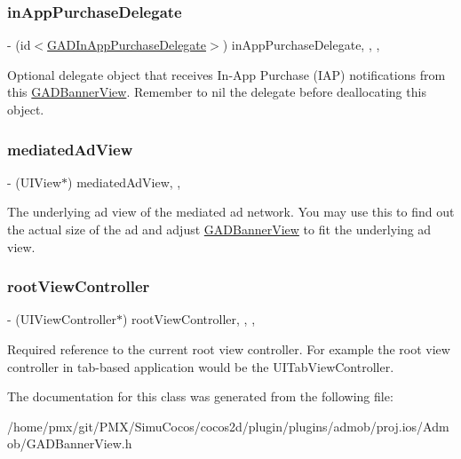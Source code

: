 \subsubsection{\texorpdfstring{in\+App\+Purchase\+Delegate}{inAppPurchaseDelegate}}
{\footnotesize\ttfamily -\/ (id$<$\hyperlink{protocolGADInAppPurchaseDelegate-p}{G\+A\+D\+In\+App\+Purchase\+Delegate}$>$) in\+App\+Purchase\+Delegate\hspace{0.3cm}{\ttfamily [read]}, {\ttfamily [write]}, {\ttfamily [nonatomic]}, {\ttfamily [weak]}}

Optional delegate object that receives In-\/\+App Purchase (I\+AP) notifications from this \hyperlink{interfaceGADBannerView}{G\+A\+D\+Banner\+View}. Remember to nil the delegate before deallocating this object. \mbox{\label{interfaceGADBannerView_a239f588da48d1fe9e12eeff079ab6700}} 
\subsubsection{\texorpdfstring{mediated\+Ad\+View}{mediatedAdView}}
{\footnotesize\ttfamily -\/ (U\+I\+View$\ast$) mediated\+Ad\+View\hspace{0.3cm}{\ttfamily [read]}, {\ttfamily [nonatomic]}, {\ttfamily [weak]}}

The underlying ad view of the mediated ad network. You may use this to find out the actual size of the ad and adjust \hyperlink{interfaceGADBannerView}{G\+A\+D\+Banner\+View} to fit the underlying ad view. \mbox{\label{interfaceGADBannerView_a6ee3d304435bd03ab011c4e08359563c}} 
\subsubsection{\texorpdfstring{root\+View\+Controller}{rootViewController}}
{\footnotesize\ttfamily -\/ (U\+I\+View\+Controller$\ast$) root\+View\+Controller\hspace{0.3cm}{\ttfamily [read]}, {\ttfamily [write]}, {\ttfamily [nonatomic]}, {\ttfamily [weak]}}

Required reference to the current root view controller. For example the root view controller in tab-\/based application would be the U\+I\+Tab\+View\+Controller. 

The documentation for this class was generated from the following file\+:\begin{DoxyCompactItemize}
\item 
/home/pmx/git/\+P\+M\+X/\+Simu\+Cocos/cocos2d/plugin/plugins/admob/proj.\+ios/\+Admob/G\+A\+D\+Banner\+View.\+h\end{DoxyCompactItemize}
